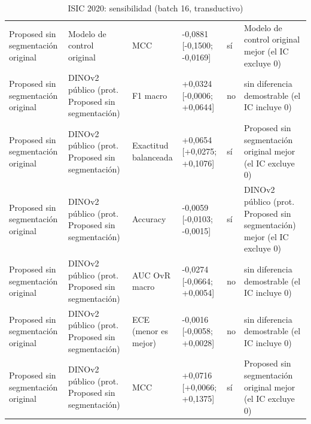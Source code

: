 \begin{table}[ht]
{\begin{tabular}{@{}llllll@{}}
Proposed sin segmentación original & Modelo de control original & MCC & -0,0881 [-0,1500; -0,0169] & sí & Modelo de control original mejor (el IC excluye 0) \\
Proposed sin segmentación original & DINOv2 público (prot. Proposed sin segmentación) & F1 macro & +0,0324 [-0,0006; +0,0644] & no & sin diferencia demostrable (el IC incluye 0) \\
Proposed sin segmentación original & DINOv2 público (prot. Proposed sin segmentación) & Exactitud balanceada & +0,0654 [+0,0275; +0,1076] & sí & Proposed sin segmentación original mejor (el IC excluye 0) \\
Proposed sin segmentación original & DINOv2 público (prot. Proposed sin segmentación) & Accuracy & -0,0059 [-0,0103; -0,0015] & sí & DINOv2 público (prot. Proposed sin segmentación) mejor (el IC excluye 0) \\
Proposed sin segmentación original & DINOv2 público (prot. Proposed sin segmentación) & AUC OvR macro & -0,0274 [-0,0664; +0,0054] & no & sin diferencia demostrable (el IC incluye 0) \\
Proposed sin segmentación original & DINOv2 público (prot. Proposed sin segmentación) & ECE (menor es mejor) & -0,0016 [-0,0058; +0,0028] & no & sin diferencia demostrable (el IC incluye 0) \\
Proposed sin segmentación original & DINOv2 público (prot. Proposed sin segmentación) & MCC & +0,0716 [+0,0066; +0,1375] & sí & Proposed sin segmentación original mejor (el IC excluye 0) \\
\bottomrule
\end{tabular}}
\caption{ISIC 2020: sensibilidad (batch 16, transductivo)}\label{tab:contrast-isic2020-sens}
\end{table}


